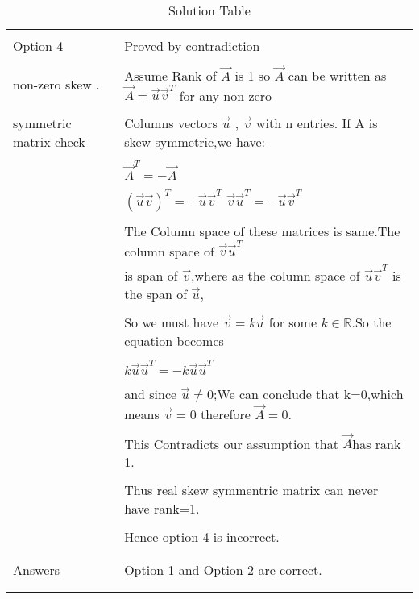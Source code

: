 \documentclass[journal,12pt]{IEEEtran}
\begin{document}
\begin{longtable}{|l|l|}
    \hline
	\multirow{3}{*}{Option 4}
	&\\
	&Proved by contradiction\\
	&\\
    non-zero skew .&Assume Rank of $\vec{A}$ is 1 so $\vec{A}$ can be written as $\vec{A}=\vec{u}\vec{v}^T$ for any non-zero\\
    &\\
    symmetric matrix check&Columns vectors $\vec{u}$ , $\vec{v}$ with n entries. If A is skew symmetric,we have:-\\
    &\\
    &$\vec{A}^T=-\vec{A}$\\
    &\\
    &$(\vec{u}\vec{v})^T=-\vec{u}\vec{v}^T$ $\vec{v}\vec{u}^T=-\vec{u}\vec{v}^T$\\
    &\\
    &The Column space of these matrices is same.The column space of $\vec{v}\vec{u}^T$\\ 
    &is span of $\vec{v}$,where as the column space of $\vec{u}\vec{v}^T$ is the span of $\vec{u}$,\\
    &\\
    &So we must have $\vec{v}=k\vec{u}$ for some $k\in\mathbb{R}$.So the equation becomes\\
    &\\
    &$k\vec{u}\vec{u}^T=-k\vec{u}\vec{u}^T$ \\
    &\\
    &and since $\vec{u}\neq 0$;We can conclude that k=0,which means $\vec{v}=0$ therefore $\vec{A}=0$.\\
    &\\
    &This Contradicts our assumption that $\vec{A}$has rank 1.\\
    &\\
    &Thus real skew symmentric matrix can never have rank=1.\\
    &\\
    &Hence option 4 is incorrect.\\
    &\\
	\hline
	\multirow{3}{*}{Answers}
	&\\
&Option 1 and Option 2 are correct.\\
&\\
	\hline
	
	\caption{Solution Table}
    \label{table:2}
\end{longtable}
\end{document}
